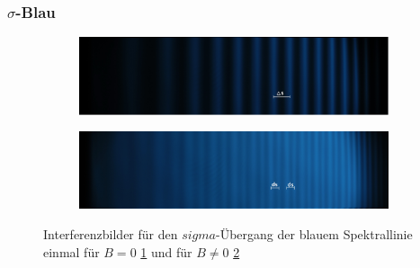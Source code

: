 \subsubsection{\texorpdfstring{$\sigma$}{TEXT}-Blau}

\begin{figure}
   \centering
   \begin{subfigure}{0.9\textwidth}
     \centering
     \includegraphics[width=1\textwidth]{blau_sigma_B=0.jpg}
     \caption{}
     \label{fig:blau_sigB=0}
   \end{subfigure}
   \begin{subfigure}{0.9\textwidth}
     \centering
     \includegraphics[width=1\textwidth]{blau_sigma_B=!0.jpg}
     \caption{}
     \label{fig:blau_sigB=!0}
   \end{subfigure}
\caption{Interferenzbilder für den $sigma$-Übergang  der blauem Spektrallinie einmal für $B=0$ \ref{fig:blau_sigB=0} und für $B\neq0$ \ref{fig:blau_sigB=!0}}
\label{fig:blau_sig}
\end{figure}




